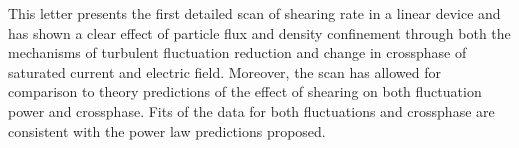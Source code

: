 \documentclass[%
 aps,
 prl,
 amsmath,amssymb,
 reprint,%
]{revtex4-1}
\begin{document}

This letter presents the first detailed scan of shearing rate in a linear device and has shown a clear effect of particle flux and density confinement through both the mechanisms of turbulent fluctuation reduction and change in crossphase of saturated current and electric field. Moreover, the scan has allowed for comparison to theory predictions of the effect of shearing on both fluctuation power and crossphase. Fits of the data for both fluctuations and crossphase are consistent with the power law predictions proposed.

\end{document}
